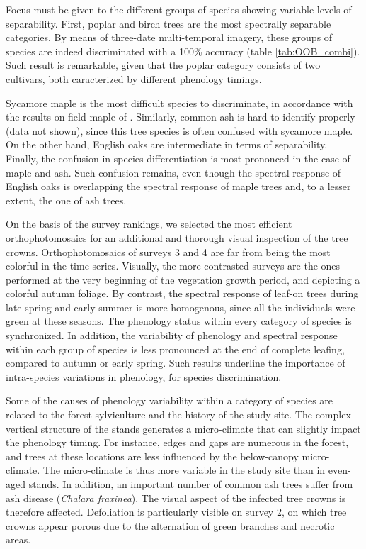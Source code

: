 \documentclass[remotesensing,article,submit,moreauthors,pdftex,12pt,a4paper]{mdpi} %
\begin{document}
Focus must be given to the different groups of species showing variable levels of separability. 
First, poplar and birch trees are the most spectrally separable categories. 
By means of three-date multi-temporal imagery, these groups of species are indeed discriminated with a 100\% accuracy (table \ref{tab:OOB_combi}). 
Such result is remarkable, given that the poplar category consists of two cultivars, both caracterized by different phenology timings. 

Sycamore maple is the most difficult species to discriminate, in accordance with the results on field maple of \citeauthor{hill_mapping_2010} \cite{hill_mapping_2010}. 
Similarly, common ash is hard to identify properly (data not shown), since this tree species is often confused with sycamore maple. 
On the other hand, English oaks are intermediate in terms of separability. 
Finally, the confusion in species differentiation is most prononced in the case of maple and ash. Such confusion remains, even though the spectral response of English oaks is overlapping the spectral response of maple trees and, to a lesser extent, the one of ash trees. 

On the basis of the survey rankings, we selected the most efficient orthophotomosaics for an additional and thorough visual inspection of the tree crowns. 
Orthophotomosaics of surveys 3 and 4 are far from being the most colorful in the time-series. 
Visually, the more contrasted surveys are the ones performed at the very beginning of the vegetation growth period, and depicting a colorful autumn foliage. 
By contrast, the spectral response of leaf-on trees during late spring and early summer is more homogenous, since all the individuals were green at these seasons. 
The phenology status within every category of species is synchronized. 
In addition, the variability of phenology and spectral response within each group of species is less pronounced at the end of complete leafing, compared to autumn or early spring. 
Such results underline the importance of intra-species variations in phenology, for species discrimination.

Some of the causes of phenology variability within a category of species are related to the forest sylviculture and the history of the study site. 
The complex vertical structure of the stands generates a micro-climate that can slightly impact the phenology timing. 
For instance, edges and gaps are numerous in the forest, and trees at these locations are less influenced by the below-canopy micro-climate. 
The micro-climate is thus more variable in the study site than in even-aged stands. 
In addition, an important number of common ash trees suffer from ash disease (\textit{Chalara fraxinea}). 
The visual aspect of the infected tree crowns is therefore affected. 
Defoliation is particularly visible on survey 2, on which tree crowns appear porous due to the alternation of green branches and necrotic areas. 
\end{document}
